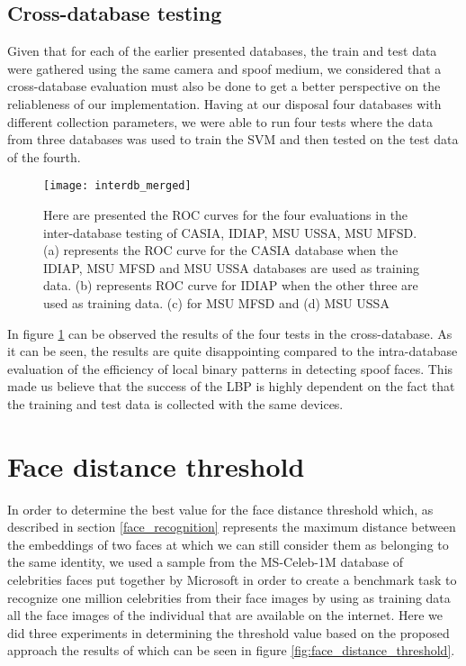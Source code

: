 \subsection{Cross-database testing}\label{section:cross_database_testing}
Given that for each of the earlier presented databases, the train and test data were gathered using the same camera and spoof medium, we considered that a cross-database evaluation must also be done to get a better perspective on the reliableness of our implementation. Having at our disposal four databases with different collection parameters, we were able to run four tests where the data from three databases was used to train the SVM and then tested on the test data of the fourth. 
\begin{figure}[H]
	\captionsetup{width=15cm,font=small}
	\begin{center}
		\texttt{[image: interdb\_merged]}
	\end{center}
	\caption[Cross-database face spoof classification results]{Here are presented the ROC curves for the four evaluations in the inter-database testing of CASIA, IDIAP, MSU USSA, MSU MFSD. (a) represents the ROC curve for the CASIA database when the IDIAP, MSU MFSD and MSU USSA databases are used as training data. (b) represents ROC curve for IDIAP when the other three are used as training data. (c) for MSU MFSD and (d) MSU USSA}
	\label{fig:interdb_results}
\end{figure}
In figure \ref{fig:interdb_results} can be observed the results of the four tests in the cross-database. As it can be seen, the results are quite disappointing compared to the intra-database evaluation of the efficiency of local binary patterns in detecting spoof faces. This made us believe that the success of the LBP is highly dependent on the fact that the training and test data is collected with the same devices.

\section{Face distance threshold}
In order to determine the best value for the face distance threshold which, as described in section \ref{face_recognition} represents the maximum distance between the embeddings of two faces at which we can still consider them as belonging to the same identity, we used a sample from the MS-Celeb-1M database of celebrities faces put together by Microsoft in order to create a benchmark task to recognize one million celebrities from their face images by using as training data all the face images of the individual that are available on the internet. Here we did three experiments in determining the threshold value based on the proposed approach the results of which can be seen in figure \ref{fig:face_distance_threshold}. 

